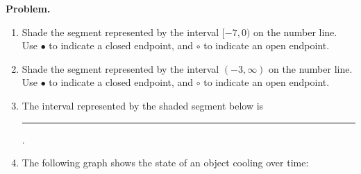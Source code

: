 \documentclass[twoside, 10pt]{article}
\begin{document}
{\noindent\bf Problem.}

\begin{enumerate}[leftmargin=*]
\item  Shade the segment represented by the interval \([-7, 0)\) on the number line. Use $\bullet$ to indicate a closed endpoint, and $\circ$ to indicate an open endpoint.
\begin{center}
\end{center}
\item  Shade the segment represented by the interval \((-3, \infty)\) on the number line. Use $\bullet$ to indicate a closed endpoint, and $\circ$ to indicate an open endpoint.
\begin{center}
\end{center}
\item The interval represented by the shaded segment below is \rule{10em}{0.1pt} .
\begin{center}
\end{center}
\item
The following graph shows the state of an object cooling over time:


\end{enumerate}
\end{document}

